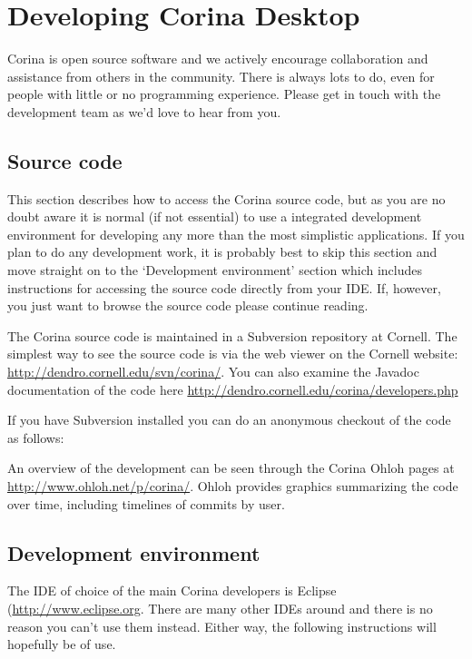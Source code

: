 \chapter{Developing Corina Desktop}
\label{txt:devDesktop}
Corina is open source software and we actively encourage collaboration and assistance from others in the community.  There is always lots to do, even for people with little or no programming experience.  Please get in touch with the development team as we'd love to hear from you.

\section{Source code}
This section describes how to access the Corina source code, but as you are no doubt aware it is normal (if not essential) to use a integrated development environment for developing any more than the most simplistic applications.  If you plan to do any development work, it is probably best to skip this section and move straight on to the `Development environment' section which includes instructions for accessing the source code directly from your IDE.  If, however, you just want to browse the source code please continue reading.

The Corina source code is maintained in a Subversion repository at Cornell.  The simplest way to see the source code is via the web viewer on the Cornell website: \url{http://dendro.cornell.edu/svn/corina/}.  You can also examine the Javadoc documentation of the code here \url{http://dendro.cornell.edu/corina/developers.php}

If you have Subversion installed you can do an anonymous checkout of the code as follows:


An overview of the development can be seen through the Corina Ohloh pages at \url{http://www.ohloh.net/p/corina/}.  Ohloh provides graphics summarizing the code over time, including timelines of commits by user.



\section{Development environment}
The IDE of choice of the main Corina developers is Eclipse (\url{http://www.eclipse.org}. There are many other IDEs around and there is no reason you can't use them instead.  Either way, the following instructions will hopefully be of use.

